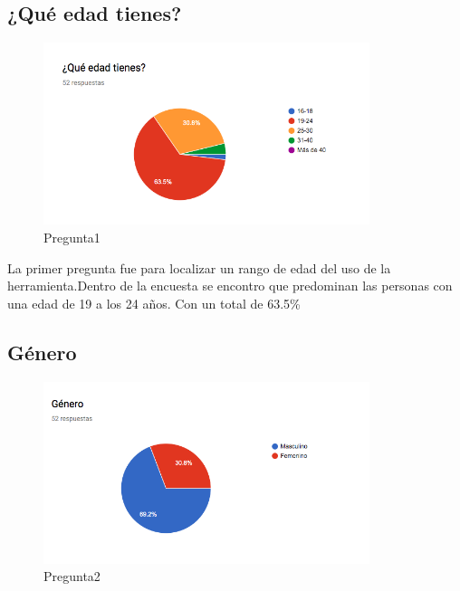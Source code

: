\subsection{¿Qué edad tienes?}
\begin{figure}[htbp!]
	\begin{center}
		\includegraphics[width=0.85\textwidth]{DisenoEstructura/imagenes/Pregunta1}
		\caption{Pregunta1}
		\label{DE/FO/Pregunta1}
	\end{center}
\end{figure}

La primer pregunta fue para localizar un rango de edad del uso de la herramienta.Dentro de la encuesta se encontro que predominan las personas con una edad de 19 a los 24 años. Con un total de 63.5\% \\


\subsection{Género}

\begin{figure}[htbp!]
	\begin{center}
		\includegraphics[width=0.85\textwidth]{DisenoEstructura/imagenes/Pregunta2}
		\caption{Pregunta2}
		\label{DE/FO/Pregunta2}
	\end{center}
\end{figure}

